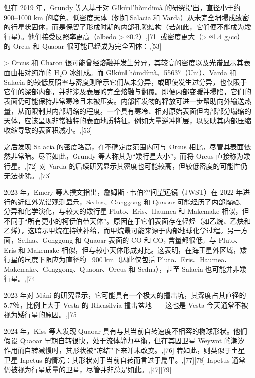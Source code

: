 但在 2019 年，Grundy 等人基于对 Gǃkúnǁʼhòmdímà 的研究提出，直径小于约 900–1000 km 的暗色、低密度天体（例如 Salacia 和 Varda）从未完全坍塌成致密的行星状固体，而是保留了形成时期的内部孔隙结构（若如此，它们便不能成为矮行星）。他们接受反照率更高（albedo > ≈0.2）,[71] 或密度更大（> ≈1.4 g/cc） 的 Orcus 和 Quaoar 很可能已经成为完全固体：,[53]

> Orcus 和 Charon 很可能曾经熔融并发生分异，其较高的密度以及光谱显示其表面由相对纯净的 H₂O 冰组成。而 Gǃkúnǁʼhòmdímà、55637（Uni）、Varda 和 Salacia 的较低反照率与密度则暗示它们从未分异，或即使发生过分异，也仅限于它们的深部内部，并非涉及表层的完全熔融与翻覆。即便内部变暖并塌陷，它们的表面仍可能保持非常寒冷且未被压实。内部挥发物的释放可进一步帮助向外输送热量，从而限制其内部坍缩的程度。一个具有寒冷、相对原始表面但内部部分塌缩的天体，应该呈现非常独特的表面地质特征，例如大量逆冲断层，以反映其内部压缩收缩导致的表面积减小。,[53]

之后发现 Salacia 的密度略高，在不确定度范围内可与 Orcus 相比，尽管其表面依然非常暗。尽管如此，Grundy 等人称其为“矮行星大小”，而将 Orcus 直接称为矮行星。,[72] 对 Varda 的后续研究显示其密度也可能较高，但较低密度的可能性仍无法排除。,[73]

2023 年，Emery 等人撰文指出，詹姆斯·韦伯空间望远镜（JWST）在 2022 年进行的近红外光谱观测显示，Sedna、Gonggong 和 Quaoar 可能经历了内部熔融、分异和化学演化，与较大的矮行星 Pluto、Eris、Haumea 和 Makemake 相似，但不同于“所有更小的柯伊伯带天体”。原因在于它们表面存在轻烃（如乙烷、乙炔和乙烯），这暗示甲烷在持续补给，而甲烷最可能来源于内部地球化学过程。另一方面，Sedna、Gonggong 和 Quaoar 表面的 CO 和 CO₂ 含量都很低，与 Pluto、Eris 和 Makemake 相似，但与较小天体形成对比。这表明，在海王星外区域，矮行星的尺度下限应为直径约 ~900 km（因此仅包括 Pluto、Eris、Haumea、Makemake、Gonggong、Quaoar、Orcus 和 Sedna），甚至 Salacia 也可能并非矮行星。,[74]

2023 年对 Máni 的研究显示，它可能具有一个极大的撞击坑，其深度占其直径的 5.7％，比例上大于 Vesta 的 Rheasilvia 撞击盆地——这也是 Vesta 今天通常不被视为矮行星的原因。,[75]

2024 年，Kiss 等人发现 Quaoar 具有与其当前自转速度不相容的椭球形状。他们假设 Quaoar 早期自转很快，处于流体静力平衡，但在其因卫星 Weywot 的潮汐作用而自转减慢时，其形状被“冻结”下来并未改变。,[76] 若如此，则类似于土星卫星 Iapetus 的情况：其形状对于当前自转而言过于扁平。,[77][78] Iapetus 通常仍被视为行星质量的卫星，尽管并非总是如此。,[47][79]

